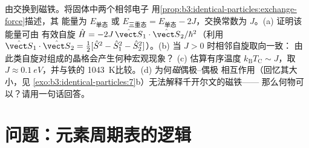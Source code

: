 \begin{exercise}[$\star\star\star$]\label{exo:b3:identical-particles:12}
由交换到磁铁。将固体中两个相邻电子
用\cref{prop:b3:identical-particles:exchange-force}描述，其
能量为 $E_{\text{单态}}$ 或 $E_{\text{三重态}} =
E_{\text{单态}} - 2J$，交换常数为 $J$。(a) 证明该能量可由
有效自旋 $\hat H =
-2J\,\hat{\vect S}_1\cdot\hat{\vect S}_2/\hbar^2$（利用
$\hat{\vect S}_1\cdot\hat{\vect S}_2 = \tfrac12[\hat S^2 - \hat
S_1^2 - \hat S_2^2]$）。(b) 当 $J > 0$ 时相邻自旋取向一致：
由此类自旋对组成的晶格会产生何种宏观现象？
(c) 估算有序温度 $k_{\text{B}}T_{\text{C}}
\sim J$，取 $J \approx \qty{0.1}{eV}$，并与铁的
\qty{1043}{K}比较。(d) 为何\emph{磁}偶极–偶极
相互作用（回忆其大小，见
\cref{exo:b3:identical-particles:7}b）无法解释千开尔文的磁铁——
那么何物可以？请用一句话回答。
\end{exercise}

\section{问题：元素周期表的逻辑}

